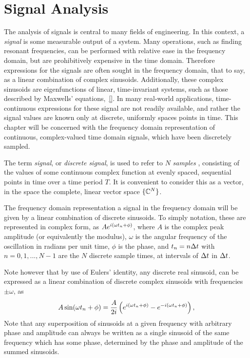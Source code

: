 \chapter{Signal Analysis}
\label{Ch:SignalAnalysis} 
The analysis of signals is central to many fields of engineering. In this context, a \textit{signal} is some measurable output of a system. Many operations, such as finding resonant frequencies, can be performed with relative ease in the frequency domain, but are prohibitively expensive in the time domain. Therefore expressions for the signals are often sought in the frequency domain, that to say, as a linear combination of complex sinusoids. Additionally, these complex sinusoids are eigenfunctions of linear, time-invariant systems, such as those described by Maxwells' equations,~\eqref{}. In many real-world applications, time-continuous expressions for these signal are not readily available, and rather the signal values are known only at discrete, uniformly spaces points in time. This chapter will be concerned with the frequency domain representation of continuous, complex-valued time domain signals, which have been discretely sampled.

The term \textit{signal}, or \textit{discrete signal}, is used to refer to $N$ \textit{ samples }, consisting of the values of some continuous complex function at evenly spaced, sequential points in time over a time period $T$. It is convenient to consider this as a vector, in the space the complete, linear vector space $ \{ \mathbb{C}^{N} \}$.

The frequency domain representation a signal in the frequency domain will be given by a linear combination of discrete sinusoids. To simply notation, these are represented in complex form, as $ A e^{i (\omega t_n + \phi) } $, where $A$ is the complex peak amplitude (or equivalently the modulus), $\omega$ is the angular frequency of the oscillation in radians per unit time, $\phi$ is the phase, and $t_n = n\Delta t$ with $n = 0,1,...,N-1$ are the $N$ discrete sample times, at intervals of $\Delta t$ in $\Delta t$.

Note however that by use of Eulers' identity, any discrete real sinusoid, can be expressed as a linear combination of discrete complex sinusoids with frequencies $\pm \omega$, as
\begin{align*}
A \sin(\omega t_n + \phi) = \frac{A}{2i} \left( e^{i (\omega t_n + \phi)} - e^{- i (\omega t_n + \phi)} \right),
\end{align*}
Note that any superposition of sinusoids at a given frequency with arbitrary phase and amplitude can always be written as a single sinusoid of the same frequency which has some phase, determined by the phase and amplitude of the summed sinusoids.

